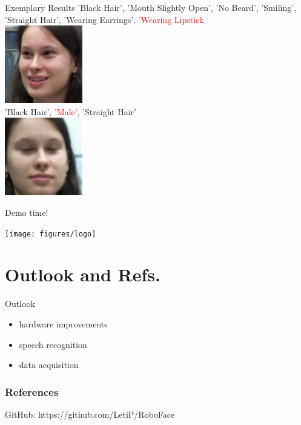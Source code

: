 \documentclass{beamer}
\begin{document}
\begin{frame}{Exemplary Results}
'Black Hair', 'Mouth Slightly Open', 'No Beard', 'Smiling', 'Straight Hair', 'Wearing Earrings', \textcolor{red}{'Wearing Lipstick}
 \\
 \centering
\includegraphics[height=0.3\textheight]{figures/leti_normalised24}\\
'Black Hair', \textcolor{red}{'Male'}, 'Straight Hair'\\
\centering
\includegraphics[height=0.3\textheight]{figures/leti_normalised0}
\end{frame}

\begin{frame}
	\centering
	\Huge{Demo time!}
	
	\vspace{5mm}
	\texttt{[image: figures/logo]}
\end{frame}

\section{Outlook and Refs.}
\begin{frame}{Outlook}
\begin{itemize}
 \item hardware improvements
 \item speech recognition
 \item data acquisition
\end{itemize}

\end{frame}

\begin{frame}
	\frametitle{References}
	\footnotesize
	
	\vspace{5mm}
	
	GitHub: 	https://github.com/LetiP/RoboFace
\end{frame}
\end{document}
